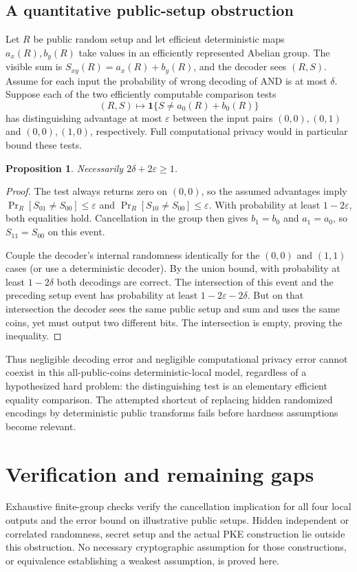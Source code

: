 \documentclass[11pt]{article}
\newtheorem{proposition}{Proposition}
\begin{document}
\subsection{A quantitative public-setup obstruction}
Let $R$ be public random setup and let efficient deterministic maps $a_x(R),b_y(R)$ take values in an efficiently represented Abelian group. The visible sum is $S_{xy}(R)=a_x(R)+b_y(R)$, and the decoder sees $(R,S)$. Assume for each input the probability of wrong decoding of AND is at most $\delta$. Suppose each of the two efficiently computable comparison tests
\[
 (R,S)\longmapsto\mathbf1\{S\ne a_0(R)+b_0(R)\}
\]
has distinguishing advantage at most $\varepsilon$ between the input pairs $(0,0),(0,1)$ and $(0,0),(1,0)$, respectively. Full computational privacy would in particular bound these tests.
\begin{proposition}
Necessarily $2\delta+2\varepsilon\ge1$.
\end{proposition}
\begin{proof}
The test always returns zero on $(0,0)$, so the assumed advantages imply
$\Pr_R[S_{01}\ne S_{00}]\le\varepsilon$ and $\Pr_R[S_{10}\ne S_{00}]\le\varepsilon$. With probability at least $1-2\varepsilon$, both equalities hold. Cancellation in the group then gives $b_1=b_0$ and $a_1=a_0$, so $S_{11}=S_{00}$ on this event.

Couple the decoder's internal randomness identically for the $(0,0)$ and $(1,1)$ cases (or use a deterministic decoder). By the union bound, with probability at least $1-2\delta$ both decodings are correct. The intersection of this event and the preceding setup event has probability at least $1-2\varepsilon-2\delta$. But on that intersection the decoder sees the same public setup and sum and uses the same coins, yet must output two different bits. The intersection is empty, proving the inequality.
\end{proof}
Thus negligible decoding error and negligible computational privacy error cannot coexist in this all-public-coins deterministic-local model, regardless of a hypothesized hard problem: the distinguishing test is an elementary efficient equality comparison. The attempted shortcut of replacing hidden randomized encodings by deterministic public transforms fails before hardness assumptions become relevant.
\section{Verification and remaining gaps}
Exhaustive finite-group checks verify the cancellation implication for all four local outputs and the error bound on illustrative public setups. Hidden independent or correlated randomness, secret setup and the actual PKE construction lie outside this obstruction. No necessary cryptographic assumption for those constructions, or equivalence establishing a weakest assumption, is proved here.
\end{document}

